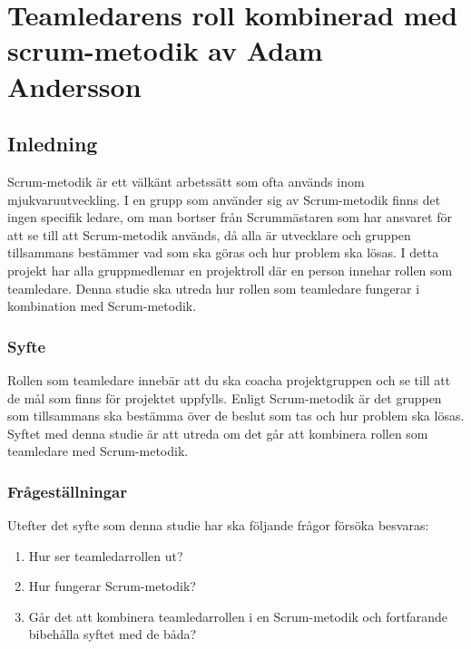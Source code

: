 \chapter{Teamledarens roll kombinerad med scrum-metodik av Adam Andersson}

\section{Inledning}
Scrum-metodik är ett välkänt arbetssätt som ofta används inom mjukvaruutveckling. I en grupp som använder sig av Scrum-metodik finns det ingen specifik ledare, om man bortser från Scrummästaren som har ansvaret för att se till att Scrum-metodik används, då alla är utvecklare och gruppen tillsammans bestämmer vad som ska göras och hur problem ska lösas.
I detta projekt har alla gruppmedlemar en projektroll där en person innehar rollen som teamledare. Denna studie ska utreda hur rollen som teamledare fungerar i kombination med Scrum-metodik.

\subsection{Syfte}
Rollen som teamledare innebär att du ska coacha projektgruppen och se till att de mål som finns för projektet uppfylls. Enligt Scrum-metodik är det gruppen som tillsammans ska bestämma över de beslut som tas och hur problem ska lösas. Syftet med denna studie är att utreda om det går att kombinera rollen som teamledare med Scrum-metodik.

\subsection{Frågeställningar}
Utefter det syfte som denna studie har ska följande frågor försöka besvaras:

\begin{enumerate}
	\item Hur ser teamledarrollen ut?
	\item Hur fungerar Scrum-metodik?
	\item Går det att kombinera teamledarrollen i en Scrum-metodik och fortfarande bibehålla syftet med de båda? 
\end{enumerate}

